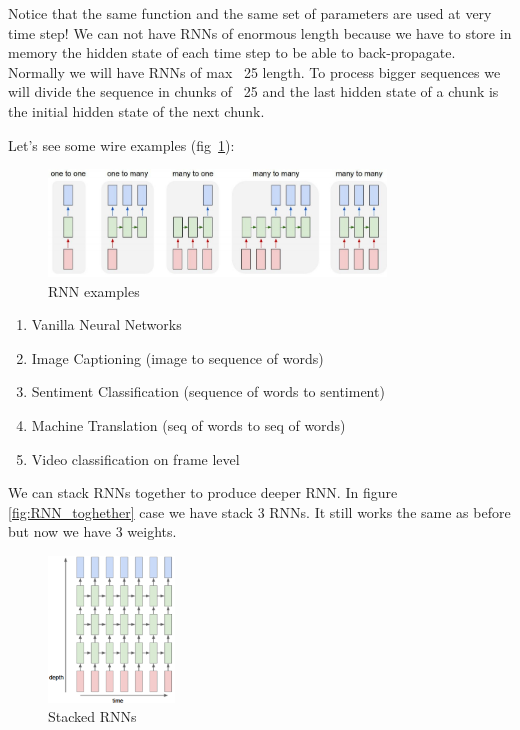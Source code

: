 \documentclass{article}
\begin{document}
	Notice that the same function and the same set of parameters are used at very time step!
	We can not have RNNs of enormous length because we have to store in memory the hidden state of each time step to be able to back-propagate. Normally we will have RNNs of max ~25 length.  To process bigger sequences we will divide the sequence in chunks of ~25 and the last hidden state of a chunk is the initial hidden state of the next chunk.
	
	Let's see some wire examples (fig~\ref{fig:rnn_examples}):
	\begin{figure}[h]
		\centering
		\includegraphics[width=0.8\textwidth]{Images/recurrent_neural_networks/2.png}
		\caption{RNN examples}
		\label{fig:rnn_examples}
	\end{figure}
	\begin{enumerate}
		\item Vanilla Neural Networks
		\item Image Captioning (image to sequence of words)
		\item Sentiment Classification (sequence of words to sentiment)
		\item Machine Translation (seq of words to seq of words)
		\item Video classification on frame level
	\end{enumerate}
	
	We can stack RNNs together to produce deeper RNN. In figure \ref{fig:RNN_toghether} case we have stack 3 RNNs. It still works the same as before but now we have 3 weights.
	\begin{figure}[h]
		\centering
		\includegraphics[width=0.3\textwidth]{Images/recurrent_neural_networks/4.png}
		\caption{Stacked RNNs}
	\end{figure}
	
\end{document}
